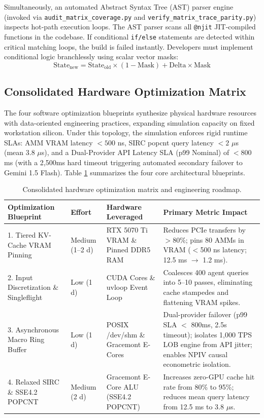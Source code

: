 Simultaneously, an automated Abstract Syntax Tree (AST) parser engine (invoked via \texttt{audit\_matrix\_\allowbreak coverage.py} and \texttt{verify\_matrix\_\allowbreak trace\_parity.py}) inspects hot-path execution loops. The AST parser scans all \texttt{@njit} JIT-compiled functions in the codebase. If conditional \texttt{if/else} statements are detected within critical matching loops, the build is failed instantly. Developers must implement conditional logic branchlessly using scalar vector masks:
\begin{equation}
    \text{State}_{\text{new}} = \text{State}_{\text{old}} \times (1 - \text{Mask}) + \text{Delta} \times \text{Mask}
\end{equation}

\subsection{Consolidated Hardware Optimization Matrix}

The four software optimization blueprints synthesize physical hardware resources with data-oriented engineering practices, expanding simulation capacity on fixed workstation silicon. Under this topology, the simulation enforces rigid runtime SLAs: AMM VRAM latency $< 500$ ns, SIRC popcnt query latency $< 2$ $\mu$s (mean $3.8$ $\mu$s), and a Dual-Provider API Latency SLA (p99 Nominal) of $< 800$ms (with a 2,500ms hard timeout triggering automated secondary failover to Gemini 1.5 Flash). Table \ref{tab:hardware_optimization_matrix} summarizes the four core architectural blueprints.

\begin{table}[htbp]
\centering
\small
\begin{tabularx}{\textwidth}{p{3.2cm} l p{3.0cm} X}
\toprule
\textbf{Optimization Blueprint} & \textbf{Effort} & \textbf{Hardware Leveraged} & \textbf{Primary Metric Impact} \\
\midrule
1. Tiered KV-Cache VRAM Pinning & Medium (1--2 d) & RTX 5070 Ti VRAM \& Pinned DDR5 RAM & Reduces PCIe transfers by $>$80\%; pins 80 AMMs in VRAM ($<$500 ns latency; 12.5 ms $\to$ 1.2 ms). \\
2. Input Discretization \& Singleflight & Low (1 d) & CUDA Cores \& uvloop Event Loop & Coalesces 400 agent queries into 5--10 passes, eliminating cache stampedes and flattening VRAM spikes. \\
3. Asynchronous Macro Ring Buffer & Low (1 d) & POSIX /dev/shm \& Gracemont E-Cores & Dual-provider failover (p99 SLA $<$ 800ms, 2.5s timeout); isolates 1,000 TPS LOB engine from API jitter; enables NPIV causal econometric isolation. \\
4. Relaxed SIRC \& SSE4.2 POPCNT & Medium (2 d) & Gracemont E-Core ALU (SSE4.2 POPCNT) & Increases zero-GPU cache hit rate from 80\% to 95\%; reduces mean query latency from 12.5 ms to 3.8 $\mu$s. \\
\bottomrule
\end{tabularx}
\caption{Consolidated hardware optimization matrix and engineering roadmap.}
\label{tab:hardware_optimization_matrix}
\end{table}
